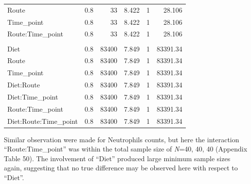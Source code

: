 \documentclass[
  12pt,
  letterpaper,
]{article}
\begin{document}
\begin{longtable}{l|rrrrr}
\midrule\addlinespace[2.5pt]
Route & 0.8 & 33 & 8.422 & 1 & 28.106 \\ 
Time\_point & 0.8 & 33 & 8.422 & 1 & 28.106 \\ 
Route:Time\_point & 0.8 & 33 & 8.422 & 1 & 28.106 \\ 
\midrule\addlinespace[2.5pt]
\multicolumn{6}{l}{Diet:Route:Time\_point} \\ 
\midrule\addlinespace[2.5pt]
Diet & 0.8 & 83400 & 7.849 & 1 & 83391.34 \\ 
Route & 0.8 & 83400 & 7.849 & 1 & 83391.34 \\ 
Time\_point & 0.8 & 83400 & 7.849 & 1 & 83391.34 \\ 
Diet:Route & 0.8 & 83400 & 7.849 & 1 & 83391.34 \\ 
Diet:Time\_point & 0.8 & 83400 & 7.849 & 1 & 83391.34 \\ 
Route:Time\_point & 0.8 & 83400 & 7.849 & 1 & 83391.34 \\ 
Diet:Route:Time\_point & 0.8 & 83400 & 7.849 & 1 & 83391.34 \\ 
\bottomrule
\end{longtable}

Similar observation were made for Neutrophils counts, but here the interaction ``Route:Time\_point'' was within the total sample size of \emph{N}=40, 40, 40 (Appendix Table 50). The involvement of ``Diet'' produced large minimum sample sizes again, suggesting that no true difference may be observed here with respect to ``Diet''.
\end{document}
